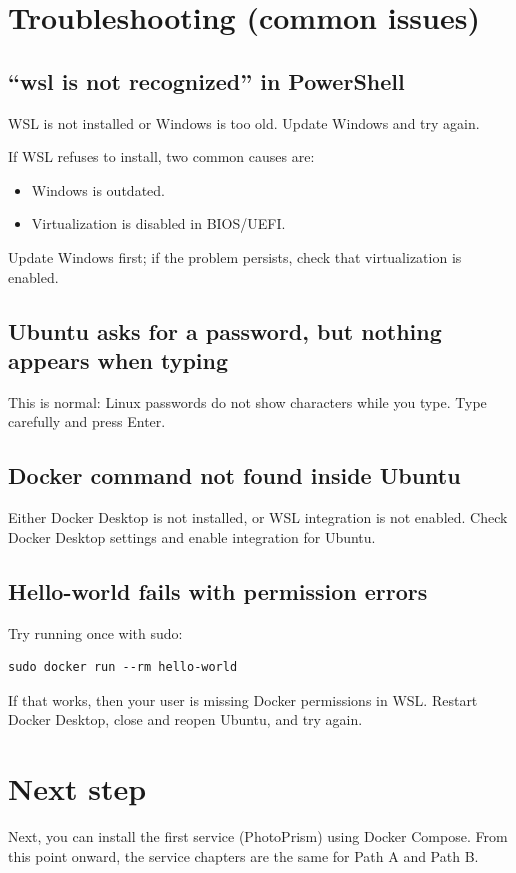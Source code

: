 \section{Troubleshooting (common issues)}

\subsection{``wsl is not recognized'' in PowerShell}
WSL is not installed or Windows is too old. Update Windows and try again.

If WSL refuses to install, two common causes are:
\begin{itemize}[leftmargin=*]
  \item Windows is outdated.
  \item Virtualization is disabled in BIOS/UEFI.
\end{itemize}
Update Windows first; if the problem persists, check that virtualization is enabled.

\subsection{Ubuntu asks for a password, but nothing appears when typing}
This is normal: Linux passwords do not show characters while you type. Type carefully and press Enter.

\subsection{Docker command not found inside Ubuntu}
Either Docker Desktop is not installed, or WSL integration is not enabled.
Check Docker Desktop settings and enable integration for Ubuntu.

\subsection{Hello-world fails with permission errors}
Try running once with sudo:
\begin{lstlisting}
sudo docker run --rm hello-world
\end{lstlisting}
If that works, then your user is missing Docker permissions in WSL.
Restart Docker Desktop, close and reopen Ubuntu, and try again.

\section{Next step}
Next, you can install the first service (PhotoPrism) using Docker Compose.
From this point onward, the service chapters are the same for Path A and Path B.

